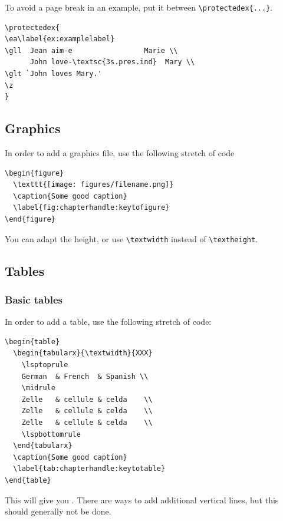 To avoid a page break in an example, put it between \verb+\protectedex{...}+. 

\begin{verbatim}
\protectedex{
\ea\label{ex:examplelabel} 
\gll  Jean aim-e                 Marie \\
      John love-\textsc{3s.pres.ind}  Mary \\
\glt `John loves Mary.'    
\z
}
\end{verbatim}
 
\subsection{Graphics}
In order to add a graphics file, use the following stretch of code

\begin{verbatim}
\begin{figure}
  \texttt{[image: figures/filename.png]}
  \caption{Some good caption}
  \label{fig:chapterhandle:keytofigure}
\end{figure}
\end{verbatim}

You can adapt the height, or use \verb+\textwidth+ instead of \verb+\textheight+.

\subsection{Tables}
\subsubsection{Basic tables}
In order to add a table, use the following stretch of code:

\begin{verbatim}
\begin{table} 
  \begin{tabularx}{\textwidth}{XXX}
    \lsptoprule
    German  & French  & Spanish \\
    \midrule
    Zelle   & cellule & celda    \\
    Zelle   & cellule & celda    \\
    Zelle   & cellule & celda    \\
    \lspbottomrule
  \end{tabularx}
  \caption{Some good caption}
  \label{tab:chapterhandle:keytotable}
\end{table}
\end{verbatim}

This will give you  . There are ways to add additional vertical lines, but this should generally not be done. 

